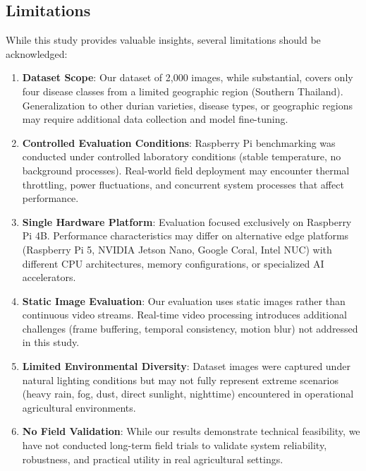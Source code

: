 \subsection{Limitations}

While this study provides valuable insights, several limitations should be acknowledged:

\begin{enumerate}
\item \textbf{Dataset Scope}: Our dataset of 2,000 images, while substantial, covers only four disease classes from a limited geographic region (Southern Thailand). Generalization to other durian varieties, disease types, or geographic regions may require additional data collection and model fine-tuning.

\item \textbf{Controlled Evaluation Conditions}: Raspberry Pi benchmarking was conducted under controlled laboratory conditions (stable temperature, no background processes). Real-world field deployment may encounter thermal throttling, power fluctuations, and concurrent system processes that affect performance.

\item \textbf{Single Hardware Platform}: Evaluation focused exclusively on Raspberry Pi 4B. Performance characteristics may differ on alternative edge platforms (Raspberry Pi 5, NVIDIA Jetson Nano, Google Coral, Intel NUC) with different CPU architectures, memory configurations, or specialized AI accelerators.

\item \textbf{Static Image Evaluation}: Our evaluation uses static images rather than continuous video streams. Real-time video processing introduces additional challenges (frame buffering, temporal consistency, motion blur) not addressed in this study.

\item \textbf{Limited Environmental Diversity}: Dataset images were captured under natural lighting conditions but may not fully represent extreme scenarios (heavy rain, fog, dust, direct sunlight, nighttime) encountered in operational agricultural environments.

\item \textbf{No Field Validation}: While our results demonstrate technical feasibility, we have not conducted long-term field trials to validate system reliability, robustness, and practical utility in real agricultural settings.
\end{enumerate}

